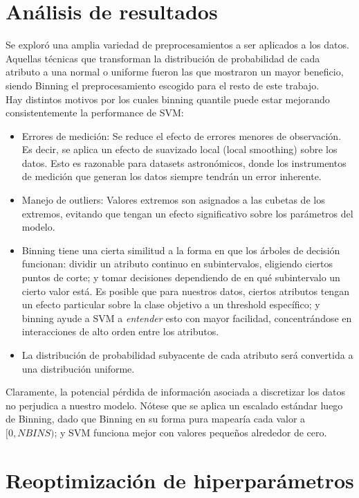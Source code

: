 \section{Análisis de resultados}

Se exploró una amplia variedad de preprocesamientos a ser aplicados a los datos. Aquellas técnicas que transforman la distribución de probabilidad de cada atributo a una normal o uniforme fueron las que mostraron un mayor beneficio, siendo Binning el preprocesamiento escogido para el resto de este trabajo. \\

Hay distintos motivos por los cuales binning quantile puede estar mejorando consistentemente la performance de SVM:

\begin{itemize}
\item Errores de medición: Se reduce el efecto de errores menores de observación. Es decir, se aplica un efecto de suavizado local (local smoothing) sobre los datos. Esto es razonable para datasets astronómicos, donde los instrumentos de medición que generan los datos siempre tendrán un error inherente.
\item Manejo de outliers: Valores extremos son asignados a las cubetas de los extremos, evitando que tengan un efecto significativo sobre los parámetros del modelo.
\item Binning tiene una cierta similitud a la forma en que los árboles de decisión funcionan: dividir un atributo continuo en subintervalos, eligiendo ciertos puntos de corte; y tomar decisiones dependiendo de en qué subintervalo un cierto valor está. Es posible que para nuestros datos, ciertos atributos tengan un efecto particular sobre la clase objetivo a un threshold específico; y binning ayude a SVM a \textit{entender} esto con mayor facilidad, concentrándose en interacciones de alto orden entre los atributos.
\item La distribución de probabilidad subyacente de cada atributo será convertida a una distribución uniforme.
\end{itemize} 

Claramente, la potencial pérdida de información asociada a discretizar los datos no perjudica a nuestro modelo. Nótese que se aplica un escalado estándar luego de Binning, dado que Binning en su forma pura mapearía cada valor a $[0,NBINS)$; y SVM funciona mejor con valores pequeños alrededor de cero. \\

\section{Reoptimización de hiperparámetros}

